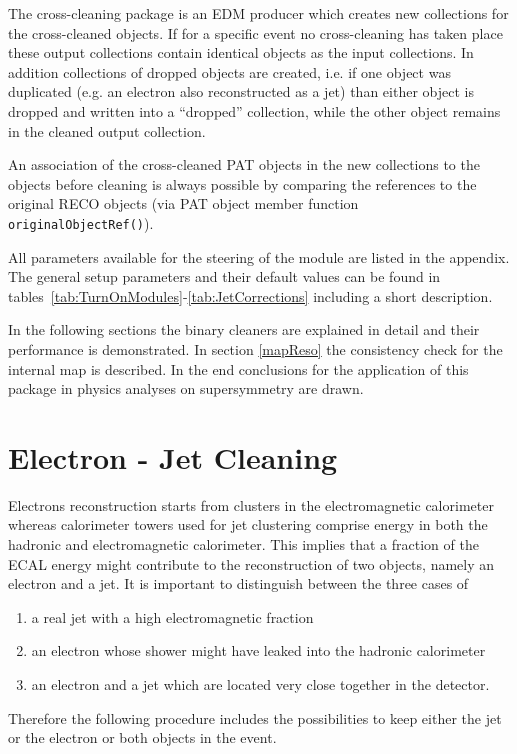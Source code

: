 \documentclass{cmspaper}
\begin{document}
The cross-cleaning package is an EDM producer which creates new collections for
the cross-cleaned objects. If for a specific event no cross-cleaning has taken
place these output collections contain identical objects as the input
collections.  In addition collections of dropped objects are created, i.e. if
one object was duplicated (e.g. an electron also reconstructed as a jet) than
either object is dropped and written into a ``dropped'' collection, while the
other object remains in the cleaned output collection.

An association of the cross-cleaned PAT objects in the new collections to the
objects before cleaning is always possible by comparing the references to the
original RECO objects (via PAT object member function
\\\texttt{originalObjectRef()}). 

All parameters available for the steering of the module are listed in the
appendix. The general setup parameters and their default values can be found in
tables~\ref{tab:TurnOnModules}-\ref{tab:JetCorrections} including a short
description.

In the following sections the binary cleaners are explained in detail and their
performance is demonstrated. In section \ref{mapReso} the consistency check for
the internal map is described. In the end conclusions for the application of
this package in physics analyses on supersymmetry are drawn.


\section{Electron - Jet Cleaning}
\label{sec:ElecJet}
Electrons reconstruction starts from clusters in the electromagnetic calorimeter
whereas calorimeter towers used for jet clustering comprise energy in both the
hadronic and electromagnetic calorimeter. This implies that a fraction of the
ECAL energy might contribute to the reconstruction of two objects, namely an
electron and a jet. It is important to distinguish between the three cases of
\begin{enumerate}
\item  a real jet with a high electromagnetic fraction
\item an electron whose shower might have leaked into the hadronic
    calorimeter
\item an electron and a jet which are located very close together in the
    detector.
\end{enumerate}
Therefore the following procedure includes the possibilities to keep either the
jet or the electron or both objects in the event.
\end{document}
